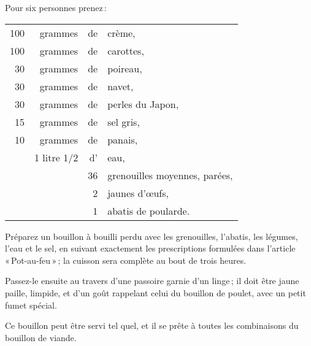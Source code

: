 \medskip

Pour six personnes prenez :

\medskip

\footnotesize
\begin{longtable}{rrrp{16em}}                                                    
    100 & grammes     & de & crème,                                                                       \\
    100 & grammes     & de & carottes,                                                                    \\
     30 & grammes     & de & poireau,                                                                     \\
     30 & grammes     & de & navet,                                                                       \\
     30 & grammes     & de & perles du Japon,                                                             \\
     15 & grammes     & de & sel gris,                                                                    \\
     10 & grammes     & de & panais,                                                                      \\
        & 1 litre 1/2 & d' & eau,                                                                         \\
        &             & 36 & grenouilles moyennes, parées,                                                \\
        &             &  2 & jaunes d'œufs,                                                               \\
        &             &  1 & abatis de poularde.                                                          \\
\end{longtable}
\normalsize       

Préparez un bouillon à bouilli perdu avec les grenouilles, l'abatis, les
légumes, l'eau et le sel, en suivant exactement les prescriptions formulées
dans l’article « Pot-au-feu » ; la cuisson sera complète au bout de trois
heures.

Passez-le ensuite au travers d'une passoire garnie d'un linge ; il doit être jaune
paille, limpide, et d'un goût rappelant celui du bouillon de poulet, avec un petit
fumet spécial.

Ce bouillon peut être servi tel quel, et il se prête à toutes les combinaisons
du bouillon de viande.

